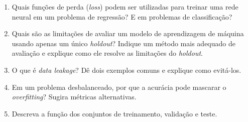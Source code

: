 \documentclass[12pt,a4paper]{article}
\begin{document}
\begin{enumerate}[leftmargin=0.55cm,itemsep=0.65em]
  \item Quais funções de perda (\textit{loss}) podem ser utilizadas para treinar uma rede neural em um problema de regressão? E em problemas de classificação?
  
  \item Quais são as limitações de avaliar um modelo de aprendizagem de máquina usando apenas um único \textit{holdout}? Indique um método mais adequado de avaliação e explique como ele resolve as limitações do \textit{holdout}.
  
  \item O que é \textit{data leakage}? Dê dois exemplos comuns e explique como evitá-los.
  
  \item Em um problema desbalanceado, por que a acurácia pode mascarar o \textit{overfitting}? Sugira métricas alternativas.
  
  \item Descreva a função dos conjuntos de treinamento, validação e teste.

\end{enumerate}
\end{document}
